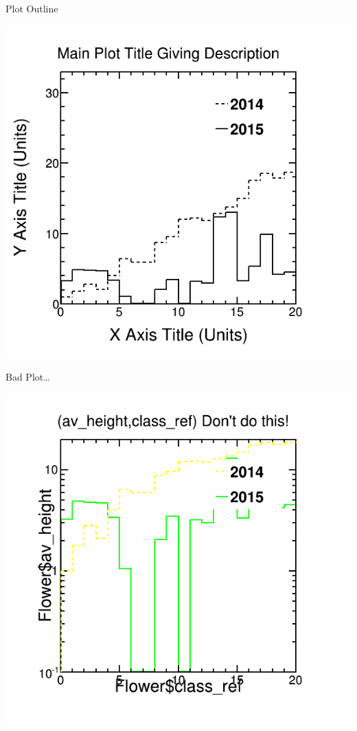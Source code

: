 \documentclass{beamer}
\begin{document}
\begin{frame}{Plot Outline}
\begin{center}
\includegraphics[scale=0.35]{pics/goodplot.png}
\end{center}
\end{frame}

\begin{frame}{Bad Plot\ldots}
\begin{center}
\includegraphics[scale=0.35]{pics/badplot.png}
\end{center}
\end{frame}
\end{document}
